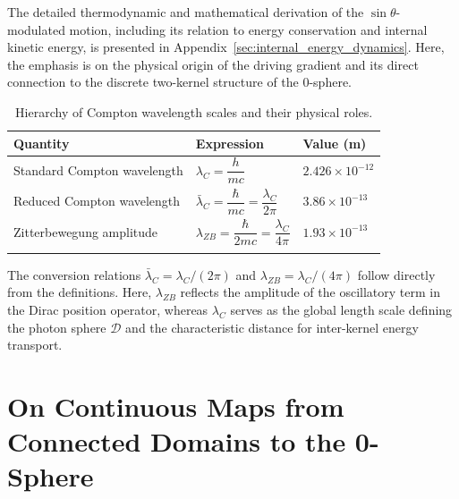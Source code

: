\documentclass[%
 reprint,
 amsmath,amssymb,
 aps,
 prb,
]{revtex4-2}
\numberwithin{equation}{section}
\begin{document}
The detailed thermodynamic and mathematical derivation of the $\sin\theta$-modulated motion, including its relation to energy conservation and internal kinetic energy, is presented in Appendix~\ref{sec:internal_energy_dynamics}.
Here, the emphasis is on the physical origin of the driving gradient and its direct connection to the discrete two-kernel structure of the 0-sphere.


\begin{table}[t!]
\centering
\caption{Hierarchy of Compton wavelength scales and their physical roles.}
\label{tab:compton_wavelength_hierarchy}
\renewcommand{\arraystretch}{1.4}
\begin{tabular}{p{6.0cm}p{6.0cm}p{5.0cm}}
\toprule
\textbf{Quantity} & \textbf{Expression} & \textbf{Value (m)} \\
\midrule
Standard Compton wavelength
& $\lambda_C = \dfrac{h}{mc}$
& $2.426 \times 10^{-12}$ \\
\addlinespace[0.25cm]

Reduced Compton wavelength
& $\bar{\lambda}_C = \dfrac{\hbar}{mc} = \dfrac{\lambda_C}{2\pi}$
& $3.86 \times 10^{-13}$ \\
\addlinespace[0.25cm]

Zitterbewegung amplitude
& $\lambda_{ZB} = \dfrac{\hbar}{2mc} = \dfrac{\lambda_C}{4\pi}$
& $1.93 \times 10^{-13}$ \\
\addlinespace[0.20cm]
\bottomrule
\end{tabular}

\vspace{0.4em}
\begin{minipage}{0.95\textwidth}
\justifying\small
The conversion relations $\bar{\lambda}_C = \lambda_C/(2\pi)$ and
$\lambda_{ZB} = \lambda_C/(4\pi)$ follow directly from the definitions.
Here, $\lambda_{ZB}$ reflects the amplitude of the oscillatory term in the Dirac position operator,
whereas $\lambda_C$ serves as the global length scale defining the photon sphere $\mathcal{D}$
and the characteristic distance for inter-kernel energy transport.
\end{minipage}
\end{table}


\section{On Continuous Maps from Connected Domains to the 0-Sphere}
\label{sec:appendix_continuous}
\end{document}
